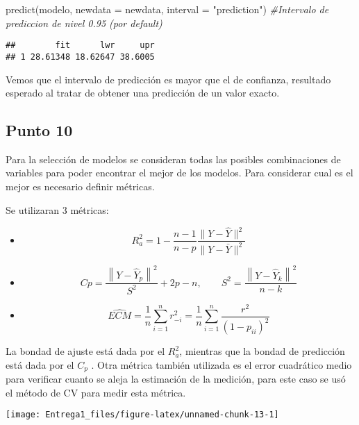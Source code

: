 \documentclass[
]{article}
\newenvironment{Shaded}{\begin{snugshade}}{\end{snugshade}}
\newcommand{\AttributeTok}[1]{\textcolor[rgb]{0.77,0.63,0.00}{#1}}
\newcommand{\CommentTok}[1]{\textcolor[rgb]{0.56,0.35,0.01}{\textit{#1}}}
\newcommand{\FunctionTok}[1]{\textcolor[rgb]{0.00,0.00,0.00}{#1}}
\newcommand{\NormalTok}[1]{#1}
\newcommand{\StringTok}[1]{\textcolor[rgb]{0.31,0.60,0.02}{#1}}
\begin{document}
\begin{Shaded}
\begin{Highlighting}[]
\FunctionTok{predict}\NormalTok{(modelo, }\AttributeTok{newdata =}\NormalTok{ newdata, }\AttributeTok{interval =} \StringTok{"prediction"}\NormalTok{) }\CommentTok{\#Intervalo de prediccion de nivel 0.95 (por default) }
\end{Highlighting}
\end{Shaded}

\begin{verbatim}
##        fit      lwr     upr
## 1 28.61348 18.62647 38.6005
\end{verbatim}

Vemos que el intervalo de predicción es mayor que el de confianza,
resultado esperado al tratar de obtener una predicción de un valor
exacto.

\hypertarget{punto-10}{%
\subsection{Punto 10}\label{punto-10}}

Para la selección de modelos se consideran todas las posibles
combinaciones de variables para poder encontrar el mejor de los modelos.
Para considerar cual es el mejor es necesario definir métricas.

Se utilizaran 3 métricas:

\begin{itemize}
\item
  \[
  R_{a}^{2}=1-\frac{n-1}{n-p} \frac{\|Y-\hat{Y}\|^{2}}{\|Y-\bar{Y}\|^{2}}
  \]
\item
  \[
  C p=\frac{\left\|Y-\hat{Y}_{p}\right\|^{2}}{S^{2}}+2 p-n, \quad \quad S^{2}=\frac{\left\|Y-\hat{Y}_{k}\right\|^{2}}{n-k}
  \]
\item
  \[
  \widehat{E C M}=\frac{1}{n} \sum_{i=1}^{n} r_{-i}^{2}=\frac{1}{n} \sum_{i=1}^{n} \frac{r^{2}}{\left(1-p_{i i}\right)^{2}}
  \]
\end{itemize}

La bondad de ajuste está dada por el \(R_{a}^{2}\), mientras que la
bondad de predicción está dada por el \(C_p\) . Otra métrica también
utilizada es el error cuadrático medio para verificar cuanto se aleja la
estimación de la medición, para este caso se usó el método de CV para
medir esta métrica.

\begin{center}\texttt{[image: Entrega1\_files/figure-latex/unnamed-chunk-13-1]} \end{center}
\end{document}
